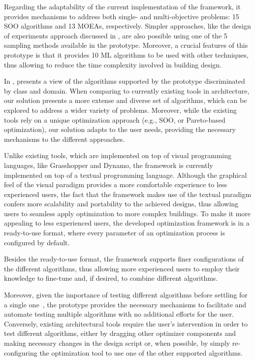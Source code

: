 Regarding the adaptability of the current implementation of the framework, it provides mechanisms to address both single- and multi-objective problems: 15 \ac{SOO} algorithms and 13 \acp{MOEA}, respectively. Simpler approaches, like the design of experiments approach discussed in , are also possible using one of the 5 sampling methods available in the prototype. Moreover, a crucial features of this prototype is that it provides 10 \ac{ML} algorithms to be used with other techniques, thus allowing to reduce the time complexity involved in building design. 

In ,  presents a view of the algorithms supported by the prototype discriminated by class and domain. When comparing to currently existing tools in architecture, our solution presents a more extense and diverse set of algorithms, which can be explored to address a wider variety of problems. Moreover, while the existing tools rely on a unique optimization approach (e.g., \ac{SOO}, or Pareto-based optimization), our solution adapts to the user needs, providing the necessary mechanisms to the different approaches.

Unlike existing tools, which are implemented on top of visual programming languages, like Grasshopper and Dynamo, the framework is currently implemented on top of a textual programming language. Although the graphical feel of the visual paradigm provides a more comfortable experience to less experienced users, the fact that the framework makes use of the textual paradigm confers more scalability and portability to the achieved designs, thus allowing users to seamless apply optimization to more complex buildings. To make it more appealing to less experienced users, the developed optimization framework is in a ready-to-use format, where every parameter of an optimization process is configured by default.  

Besides the ready-to-use format, the framework supports finer configurations of the different algorithms, thus allowing more experienced users to employ their knowledge to fine-tune and, if desired, to combine different algorithms. 

Moreover, given the importance of testing different algorithms before settling for a single one~\cite{Wortmann2016BBO}, the prototype provides the necessary mechanisms to facilitate and automate testing multiple algorithms with no additional efforts for the user. Conversely, existing architectural tools require the user's intervention in order to test different algorithms, either by dragging other optimizer components and making necessary changes in the design script or, when possible, by simply re-configuring the optimization tool to use one of the other supported algorithms. 

